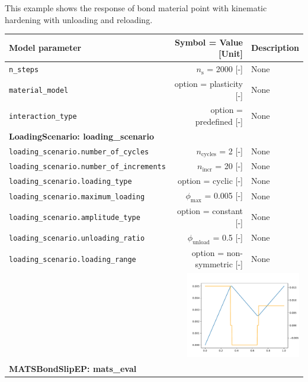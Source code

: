 \documentclass[main.tex]{subfiles}
\begin{document}
\begin{bmcsexample}
\noindent This example shows the response of bond material point 
with kinematic hardening with unloading and reloading.
 \\[3mm]
\begin{center}
            
{\scriptsize 
\begin{longtable}{lrp{4cm}}\toprule
\textbf{\textsf{Model parameter}} 
& 
\textbf{\textsf{Symbol = Value [Unit]}} 
&
\textbf{\textsf{Description}}  \\\midrule \midrule
\texttt{n\_steps} & $n_\mathrm{s}$ = 2000 [-] & {\footnotesize None}  \\
            \texttt{material\_model} & option = plasticity [-] & {\footnotesize None}  \\
            \texttt{interaction\_type} & option = predefined [-] & {\footnotesize None}  \\
            \midrule
\multicolumn{3}{l}{\textbf{\textsf{LoadingScenario: loading\_scenario}}}\\

\texttt{loading\_scenario.number\_of\_cycles} & $n_\mathrm{cycles}$ = 2 [-] & {\footnotesize None}  \\
            \texttt{loading\_scenario.number\_of\_increments} & $n_{\mathrm{incr}}$ = 20 [-] & {\footnotesize None}  \\
            \texttt{loading\_scenario.loading\_type} & option = cyclic [-] & {\footnotesize None}  \\
            \texttt{loading\_scenario.maximum\_loading} & $\phi_{\max}$ = 0.005 [-] & {\footnotesize None}  \\
            \texttt{loading\_scenario.amplitude\_type} & option = constant [-] & {\footnotesize None}  \\
            \texttt{loading\_scenario.unloading\_ratio} & $\phi_{\mathrm{unload}}$ = 0.5 [-] & {\footnotesize None}  \\
            \texttt{loading\_scenario.loading\_range} & option = non-symmetric [-] & {\footnotesize None}  \\
            
\multicolumn{3}{r}{\includegraphics[width=5cm]{examples/e22_bond_slip_plasticity_kinem/fig_loading_scenario.pdf}}\\
\midrule
\multicolumn{3}{l}{\textbf{\textsf{MATSBondSlipEP: mats\_eval}}}\\


\end{longtable}}
\end{center}
\end{bmcsexample}
\end{document}
